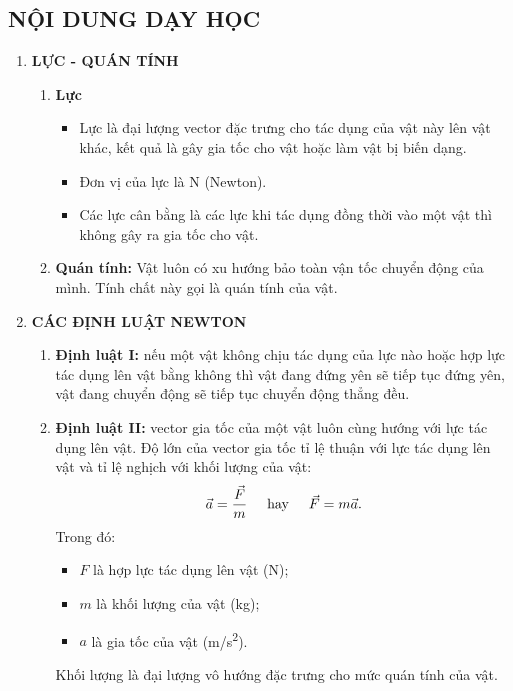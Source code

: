 \subsection{NỘI DUNG DẠY HỌC}
\begin{enumerate}[label=\bfseries\Roman*.]
	\item \textbf{LỰC - QUÁN TÍNH}
	\begin{enumerate}[label=\bfseries \arabic*., leftmargin=1cm]
		\item \textbf{Lực}
		\begin{itemize}
			\item Lực là đại lượng vector đặc trưng cho tác dụng của vật này lên vật khác, kết quả là gây gia tốc cho vật hoặc làm vật bị biến dạng.
			\item Đơn vị của lực là $\si{\newton}$ (Newton).
			\item Các lực cân bằng là các lực khi tác dụng đồng thời vào một vật thì không gây ra gia tốc cho vật.
		\end{itemize}
		\item \textbf{Quán tính:} Vật luôn có xu hướng bảo toàn vận tốc chuyển động của mình. Tính chất này gọi là quán tính của vật.
	\end{enumerate}
	\item\textbf{CÁC ĐỊNH LUẬT NEWTON}
	\begin{enumerate}[label=\bfseries \arabic*., leftmargin=1cm]
		\item \textbf{Định luật I:} nếu một vật không chịu tác dụng của lực nào hoặc hợp lực tác dụng lên vật bằng không thì vật đang đứng yên sẽ tiếp tục đứng yên, vật đang chuyển động sẽ tiếp tục chuyển động thẳng đều.
		\item \textbf{Định luật II:}  vector gia tốc của một vật luôn cùng hướng với lực tác dụng lên vật. Độ lớn của vector gia tốc tỉ lệ thuận với lực tác dụng lên vật và tỉ lệ nghịch với khối lượng của vật:
		$$\vec{a}=\dfrac{\vec{F}}{m} \hspace{0.5cm} \text{hay}\hspace{0.5cm} \vec{F}=m\vec{a}.$$
		Trong đó:
		\begin{itemize}
			\item $F$ là hợp lực tác dụng lên vật (\si{\newton});
			\item $m$ là khối lượng của vật (\si{\kilogram});
			\item $a$ là gia tốc của vật (\si{\meter/\second^2}).
					\end{itemize}
			Khối lượng là đại lượng vô hướng đặc trưng cho mức quán tính của vật.

\end{enumerate}
\end{enumerate}
